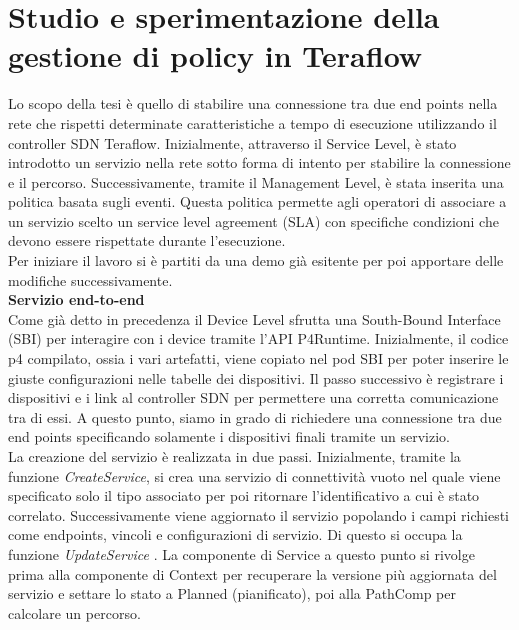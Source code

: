 \chapter{Studio e sperimentazione della gestione di policy in Teraflow}
\label{cap:policy}
Lo scopo della tesi è quello di stabilire una connessione tra due end points nella rete che rispetti determinate caratteristiche a tempo di esecuzione utilizzando il controller SDN Teraflow.
Inizialmente, attraverso il Service Level, è stato introdotto un servizio nella rete sotto forma di intento per stabilire la connessione e il percorso. 
Successivamente, tramite il Management Level, è stata inserita una politica basata sugli eventi. Questa politica permette agli operatori 
di associare a un servizio scelto un service level agreement (SLA) con specifiche condizioni che devono essere rispettate durante l'esecuzione.
\\Per iniziare il lavoro si è partiti da una demo già esitente per poi apportare delle modifiche successivamente.
\\\textbf{Servizio end-to-end}
\\Come già detto in precedenza il Device Level sfrutta una South-Bound Interface (SBI) per interagire con i device tramite l'API P4Runtime. 
Inizialmente, il codice p4 compilato, ossia i vari artefatti, viene copiato nel pod SBI per poter inserire le giuste configurazioni nelle tabelle dei dispositivi.
Il passo successivo è registrare i dispositivi e i link al controller SDN per permettere una corretta comunicazione tra di essi.
A questo punto, siamo in grado di richiedere una connessione tra due end points specificando solamente i dispositivi finali tramite un servizio.
\\La creazione del servizio è realizzata in due passi. 
Inizialmente, tramite la funzione \textit{CreateService}, si crea una servizio di connettività vuoto nel quale viene specificato solo il tipo associato per poi ritornare l'identificativo a cui è stato correlato.
Successivamente viene aggiornato il servizio popolando i campi richiesti come endpoints, vincoli e configurazioni di servizio. Di questo si occupa la funzione \textit{UpdateService} \cite{D32}.
La componente di Service a questo punto si rivolge prima alla componente di Context per recuperare la versione più aggiornata del servizio e settare lo stato a Planned (pianificato), poi alla PathComp per calcolare un percorso.
